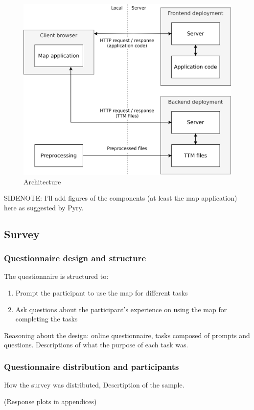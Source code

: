 \begin{figure}[H]
	\centering
	\includegraphics[width=\diagramwidth]{visual/figures/diagrams/architechture.png}
	\caption{Architecture}
	\label{fig:architechture}
\end{figure}

SIDENOTE: I'll add figures of the components (at least the map application) here as suggested by Pyry.






\subsection{Survey}

\subsubsection{Questionnaire design and structure}

The questionnaire is structured to:
\begin{enumerate}
	\item Prompt the participant to use the map for different tasks
	\item Ask questions about the participant's experience
	on using the map for completing the tasks
\end{enumerate}

Reasoning about the design: online questionnaire, tasks composed of prompts and questions.
Descriptions of what the purpose of each task was.

\subsubsection{Questionnaire distribution and participants}
How the survey was distributed,
Descrtiption of the sample.

(Response plots in appendices)
